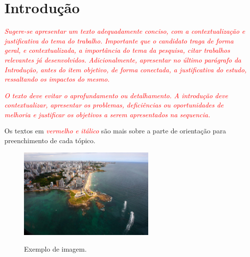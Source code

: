 \chapter{Introdução}
\label{ch:introducao}

\textit{\textcolor{red}{Sugere-se apresentar um texto adequadamente conciso, com a contextualização e justificativa do tema do trabalho. Importante que o candidato traga de forma geral, e contextualizada, a importância do tema da pesquisa, citar trabalhos relevantes já desenvolvidos. Adicionalmente, apresentar no último parágrafo da Introdução, antes do item objetivo, de forma conectada, a justificativa do estudo, ressaltando os impactos do mesmo.}}

\textit{\textcolor{red}{O texto deve evitar o aprofundamento ou detalhamento. A introdução deve contextualizar, apresentar os problemas, deficiências ou oportunidades de melhoria e justificar os objetivos a serem apresentados na sequencia.}}

Os textos em \textit{\textcolor{red}{vermelho e itálico}} são mais sobre a parte de orientação para preenchimento de cada tópico.

\begin{figure}[!h]
    \caption{Exemplo de imagem.}
    \centering
    \includegraphics[width=0.6\textwidth]{images/farol_da_barra.jpg}
    \label{fig:seismic_acq}
\end{figure}

\lipsum[1-1]

